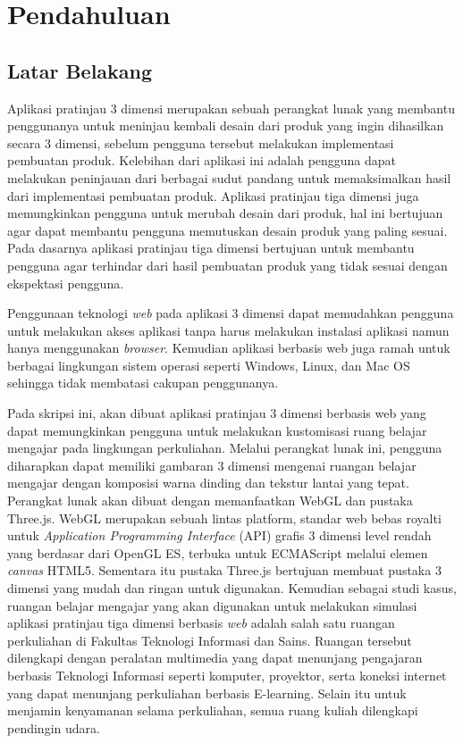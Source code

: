 \chapter{Pendahuluan}
\label{chap:intro}
   
\section{Latar Belakang}
\label{sec:label}

Aplikasi pratinjau 3 dimensi merupakan sebuah perangkat lunak yang membantu penggunanya untuk meninjau kembali desain dari produk yang ingin dihasilkan secara 3 dimensi, sebelum pengguna tersebut melakukan implementasi pembuatan produk. Kelebihan dari aplikasi ini adalah pengguna dapat melakukan peninjauan dari berbagai sudut pandang untuk memaksimalkan hasil dari implementasi pembuatan produk. Aplikasi pratinjau tiga dimensi juga memungkinkan pengguna untuk merubah desain dari produk, hal ini bertujuan agar dapat membantu pengguna memutuskan desain produk yang paling sesuai. Pada dasarnya aplikasi pratinjau tiga dimensi bertujuan untuk membantu pengguna agar terhindar dari hasil pembuatan produk yang tidak sesuai dengan ekspektasi pengguna.

Penggunaan teknologi {\it web} pada aplikasi 3 dimensi dapat memudahkan pengguna untuk melakukan akses aplikasi tanpa harus melakukan instalasi aplikasi namun hanya menggunakan {\it  browser}. Kemudian aplikasi berbasis web juga ramah untuk berbagai lingkungan sistem operasi seperti Windows, Linux, dan Mac OS sehingga tidak membatasi cakupan penggunanya.

Pada skripsi ini, akan dibuat aplikasi pratinjau 3 dimensi berbasis web yang dapat memungkinkan pengguna untuk melakukan kustomisasi ruang belajar mengajar pada lingkungan perkuliahan. Melalui perangkat lunak ini, pengguna diharapkan dapat memiliki gambaran 3 dimensi mengenai ruangan belajar mengajar dengan komposisi warna dinding dan tekstur lantai yang tepat. Perangkat lunak akan dibuat dengan memanfaatkan WebGL dan pustaka Three.js. WebGL merupakan sebuah lintas platform, standar web bebas royalti untuk {\it Application Programming Interface} (API) grafis 3 dimensi level rendah yang berdasar dari OpenGL ES, terbuka untuk ECMAScript melalui elemen {\it canvas} HTML5. Sementara itu pustaka Three.js bertujuan membuat pustaka 3 dimensi yang mudah dan ringan untuk digunakan. Kemudian sebagai studi kasus, ruangan belajar mengajar yang akan digunakan untuk melakukan simulasi aplikasi pratinjau tiga dimensi berbasis {\it web} adalah salah satu ruangan perkuliahan di Fakultas Teknologi Informasi dan Sains. Ruangan tersebut dilengkapi dengan peralatan multimedia yang dapat menunjang pengajaran berbasis Teknologi Informasi seperti komputer, proyektor, serta koneksi internet yang dapat menunjang perkuliahan berbasis E-learning. Selain itu untuk menjamin kenyamanan selama perkuliahan, semua ruang kuliah dilengkapi pendingin udara.

